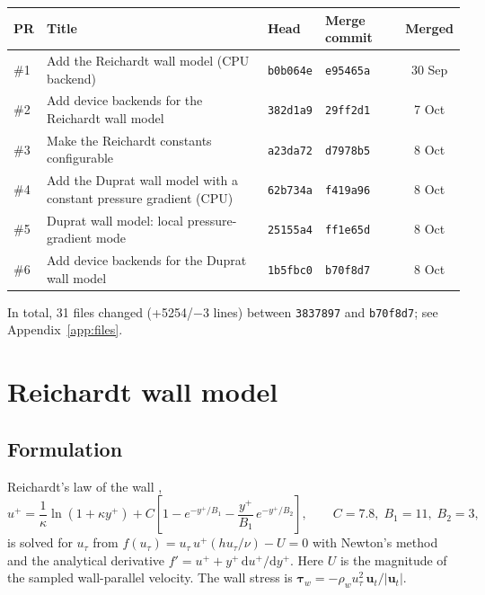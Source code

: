 \documentclass[11pt,a4paper]{article}
\newcommand{\code}[1]{\texttt{#1}}
\newcommand{\utau}{u_\tau}
\begin{document}
\begin{center}
\small
\begin{tabularx}{\textwidth}{@{}l>{\raggedright}Xllc@{}}
\toprule
PR & Title & Head & Merge commit & Merged \\
\midrule
\#1 & Add the Reichardt wall model (CPU backend) & \code{b0b064e} & \code{e95465a} & 30 Sep \\
\#2 & Add device backends for the Reichardt wall model & \code{382d1a9} & \code{29ff2d1} & 7 Oct \\
\#3 & Make the Reichardt constants configurable & \code{a23da72} & \code{d7978b5} & 8 Oct \\
\#4 & Add the Duprat wall model with a constant pressure gradient (CPU) & \code{62b734a} & \code{f419a96} & 8 Oct \\
\#5 & Duprat wall model: local pressure-gradient mode & \code{25155a4} & \code{ff1e65d} & 8 Oct \\
\#6 & Add device backends for the Duprat wall model & \code{1b5fbc0} & \code{b70f8d7} & 8 Oct \\
\bottomrule
\end{tabularx}
\end{center}

\noindent In total, 31 files changed (+5254/$-$3 lines) between
\code{3837897} and \code{b70f8d7}; see Appendix~\ref{app:files}.

\section{Reichardt wall model}

\subsection{Formulation}

Reichardt's law of the wall \cite{reichardt1951},
\begin{equation}
  u^+ = \frac{1}{\kappa}\ln(1+\kappa y^+)
      + C\left[1 - e^{-y^+/B_1} - \frac{y^+}{B_1}\,e^{-y^+/B_2}\right],
  \qquad C = 7.8,\; B_1 = 11,\; B_2 = 3,
  \label{eq:reichardt}
\end{equation}
is solved for $\utau$ from $f(\utau) = \utau\,u^+(h\utau/\nu) - U = 0$ with
Newton's method and the analytical derivative
$f' = u^+ + y^+\,\mathrm{d}u^+/\mathrm{d}y^+$. Here $U$ is the magnitude
of the sampled wall-parallel velocity. The wall stress is
$\boldsymbol\tau_w = -\rho_w\utau^2\,\mathbf{u}_t/|\mathbf{u}_t|$.
\end{document}
